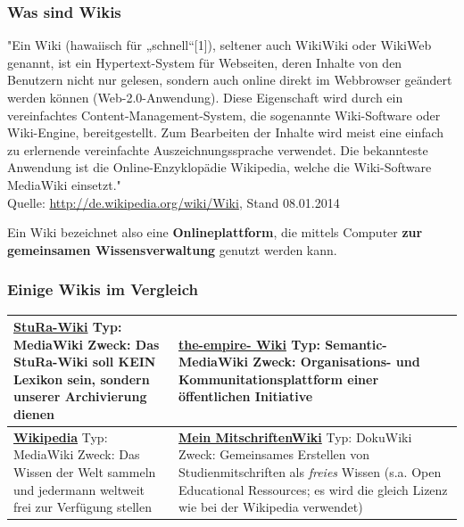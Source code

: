 \documentclass{beamer}              %
\begin{document}
\begin{frame}
  \frametitle{Was sind Wikis}
  \begin{block}{}
    {\small "Ein Wiki (hawaiisch für „schnell“[1]), seltener auch WikiWiki
    oder WikiWeb genannt, ist ein Hypertext-System für Webseiten, deren
    Inhalte von den Benutzern nicht nur gelesen, sondern auch online direkt
    im Webbrowser geändert werden können (Web-2.0-Anwendung). Diese
    Eigenschaft wird durch ein vereinfachtes Content-Management-System, die
    sogenannte Wiki-Software oder Wiki-Engine, bereitgestellt. Zum
    Bearbeiten der Inhalte wird meist eine einfach zu erlernende
    vereinfachte Auszeichnungssprache verwendet. Die bekannteste Anwendung
    ist die Online-Enzyklopädie Wikipedia, welche die Wiki-Software
    MediaWiki einsetzt." \\ Quelle: \url{http://de.wikipedia.org/wiki/Wiki}, Stand 08.01.2014}
  \end{block}
  \begin{block}{}
    Ein Wiki bezeichnet also eine \textbf{Onlineplattform}, die mittels
    Computer \textbf{zur gemeinsamen Wissensverwaltung} genutzt werden
    kann.
  \end{block}
\end{frame}

\begin{frame}
  \frametitle{Einige Wikis im Vergleich}
  \begin{table}
    \caption{Wikivergleich1}
    \label{tab:Wikivergleich1}
    \begin{center}
      \begin{longtable}{|l|l|}
        \hline
        \href{http://wiki.stura.htw-dresden.de}{StuRa-Wiki}
        Typ: MediaWiki
        Zweck: Das StuRa-Wiki soll KEIN Lexikon sein, sondern unserer Archivierung dienen &

        \textbf{\href{http://www.the-empire.de}{the-empire- Wiki}}
        Typ: Semantic-MediaWiki
        Zweck: Organisations- und Kommunitationsplattform einer öffentlichen Initiative \\ 
        \hline

        \textbf{\href{http://www.wikipedia.de}{Wikipedia}}
        Typ: MediaWiki
        Zweck: Das Wissen der Welt sammeln und jedermann weltweit frei zur Verfügung stellen &
        \textbf{\href{http://www2.htw-dresden.de/~s70341/cgi-bin/dokuwiki/doku.php}{Mein MitschriftenWiki}}
        Typ: DokuWiki
        Zweck: Gemeinsames Erstellen von Studienmitschriften als \emph{freies} Wissen (s.a.  Open Educational Ressources; es wird die gleich Lizenz wie bei der Wikipedia verwendet) \\ 
        \hline
      \end{longtable}
    \end{center}
  \end{table}

\end{frame}
\end{document}
